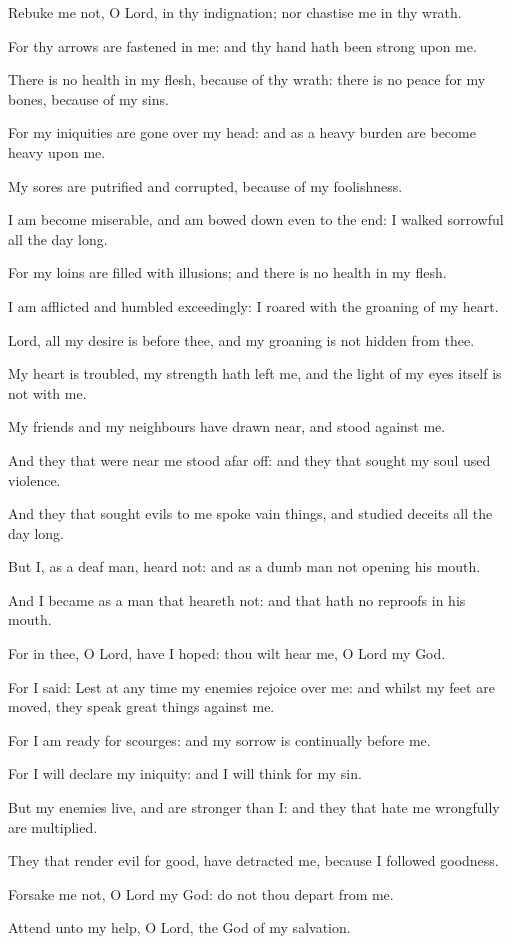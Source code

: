 ﻿\item Rebuke me not, O Lord, in thy indignation; nor chastise me in thy wrath.
\item For thy arrows are fastened in me: and thy hand hath been strong upon me.
\item There is no health in my flesh, because of thy wrath: there is no peace for my bones, because of my sins.
\item For my iniquities are gone over my head: and as a heavy burden are become heavy upon me.
\item My sores are putrified and corrupted, because of my foolishness.
\item I am become miserable, and am bowed down even to the end: I walked sorrowful all the day long.
\item For my loins are filled with illusions; and there is no health in my flesh.
\item I am afflicted and humbled exceedingly: I roared with the groaning of my heart.
\item Lord, all my desire is before thee, and my groaning is not hidden from thee.
\item My heart is troubled, my strength hath left me, and the light of my eyes itself is not with me.
\item My friends and my neighbours have drawn near, and stood against me.
\item And they that were near me stood afar off: and they that sought my soul used violence.
\item And they that sought evils to me spoke vain things, and studied deceits all the day long.
\item But I, as a deaf man, heard not: and as a dumb man not opening his mouth.
\item And I became as a man that heareth not: and that hath no reproofs in his mouth.
\item For in thee, O Lord, have I hoped: thou wilt hear me, O Lord my God.\ifx\enlinebreakaftersixteen\undefined\else\\\fi
\item For I said: Lest at any time my enemies rejoice over me: and whilst my feet are moved, they speak great things against me.
\item For I am ready for scourges: and my sorrow is continually before me.
\item For I will declare my iniquity: and I will think for my sin.
\item But my enemies live, and are stronger than I: and they that hate me wrongfully are multiplied.
\item They that render evil for good, have detracted me, because I followed goodness.
\item Forsake me not, O Lord my God: do not thou depart from me. 
\item Attend unto my help, O Lord, the God of my salvation.